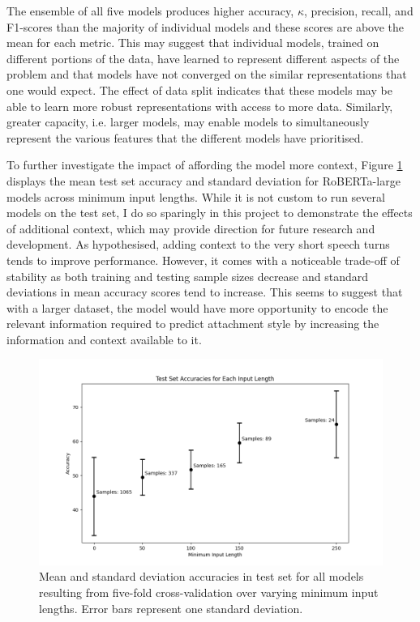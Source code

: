 \documentclass[12pt]{report}
\begin{document}
The ensemble of all five models produces higher accuracy, $\kappa$, precision, recall, and F1-scores than the majority of individual models and these scores are above the mean for each metric.
This may suggest that individual models, trained on different portions of the data, have learned to represent different aspects of the problem and that models have not converged on the similar representations that one would expect.
The effect of data split indicates that these models may be able to learn more robust representations with access to more data.
Similarly, greater capacity, i.e. larger models, may enable models to simultaneously represent the various features that the different models have prioritised.

To further investigate the impact of affording the model more context, Figure \ref{fig: roberta-large results} displays the mean test set accuracy and standard deviation for RoBERTa-large models across minimum input lengths.
While it is not custom to run several models on the test set, I do so sparingly in this project to demonstrate the effects of additional context, which may provide direction for future research and development.
As hypothesised, adding context to the very short speech turns tends to improve performance.
However, it comes with a noticeable trade-off of stability as both training and testing sample sizes decrease and standard deviations in mean accuracy scores tend to increase.
This seems to suggest that with a larger dataset, the model would have more opportunity to encode the relevant information required to predict attachment style by increasing the information and context available to it.

\begin{figure}
    \includegraphics[width=\textwidth]{figures/roberta-large_acc_for_min_len.png}
    \caption{Mean and standard deviation accuracies in test set for all models resulting from five-fold cross-validation over varying minimum input lengths. Error bars represent one standard deviation.}
    \label{fig: roberta-large results}
\end{figure}
\end{document}
